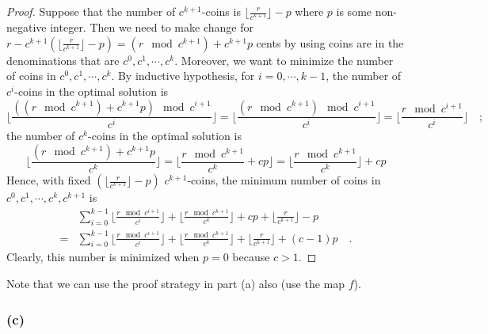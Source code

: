 \begin{proof}
    Suppose that the number of $c^{k + 1}$-coins is 
    $\lfloor \frac{r}{c^{k + 1}} \rfloor - p$ 
    where $p$ is some non-negative integer.
    Then we need to make change for 
    $r - c^{k + 1} (\lfloor \frac{r}{c^{k + 1}} \rfloor - p) = (r \mod c^{k + 1}) + c^{k + 1} p$ cents 
    by using coins are in the denominations that are 
    $c^0, c^1, \cdots, c^k$.
    Moreover, we want to minimize the number of coins in $c^0, c^1, \cdots, c^k$.
    By inductive hypothesis, for $i = 0, \cdots, k - 1$, 
    the number of $c^i$-coins in the optimal solution is 
    \begin{equation*}
        \lfloor \frac{((r \mod c^{k + 1}) + c^{k + 1} p) \mod c^{i + 1}}{c^i} \rfloor 
        = \lfloor \frac{(r \mod c^{k + 1}) \mod c^{i + 1}}{c^i} \rfloor
        = \lfloor \frac{r \mod c^{i + 1}}{c^i} \rfloor
        \quad ;
    \end{equation*}
    the number of $c^k$-coins in the optimal solution is 
    \begin{equation*}
        \lfloor \frac{(r \mod c^{k + 1}) + c^{k + 1} p}{c^k} \rfloor
        = \lfloor \frac{r \mod c^{k + 1}}{c^k} + c p \rfloor
        = \lfloor \frac{r \mod c^{k + 1}}{c^k} \rfloor + c p
    \end{equation*}
    Hence, with fixed $(\lfloor \frac{r}{c^{k + 1}} \rfloor - p)$ $c^{k + 1}$-coins, 
    the minimum number of coins in $c^0, c^1, \cdots, c^k, c^{k + 1}$ is 
    \begin{equation*}
    \begin{split}
        & \sum\limits_{i = 0}^{k - 1} 
        \lfloor \frac{r \mod c^{i + 1}}{c^i} \rfloor 
        + \lfloor \frac{r \mod c^{k + 1}}{c^k} \rfloor + c p 
        + \lfloor \frac{r}{c^{k + 1}} \rfloor - p \\
        = & \sum\limits_{i = 0}^{k - 1} 
        \lfloor \frac{r \mod c^{i + 1}}{c^i} \rfloor 
        + \lfloor \frac{r \mod c^{k + 1}}{c^k} \rfloor
        + \lfloor \frac{r}{c^{k + 1}} \rfloor
        + (c - 1)p
        \quad .
    \end{split}
    \end{equation*}
    Clearly, this number is minimized when $p = 0$ because $c > 1$.
\end{proof}

Note that we can use the proof strategy in part (a) also (use the map $f$).

\subsubsection*{(c)}

